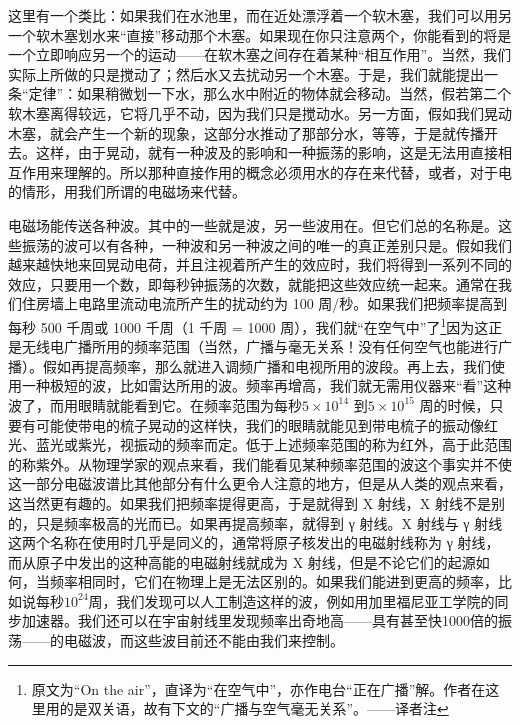 \documentclass[11pt,oneside]{book}
\begin{document}
\begin{common-format}
这里有一个类比：如果我们在水池里，而在近处漂浮着一个软木塞，我们可以用另一个软木塞划水来“直接”移动那个木塞。如果现在你只注意两个，你能看到的将是一个立即响应另一个的运动——在软木塞之间存在着某种“相互作用”。当然，我们实际上所做的只是搅动了；然后水又去扰动另一个木塞。于是，我们就能提出一条“定律”：如果稍微划一下水，那么水中附近的物体就会移动。当然，假若第二个软木塞离得较远，它将几乎不动，因为我们只是搅动水。另一方面，假如我们晃动木塞，就会产生一个新的现象，这部分水推动了那部分水，等等，于是就传播开去。这样，由于晃动，就有一种波及的影响和一种振荡的影响，这是无法用直接相互作用来理解的。所以那种直接作用的概念必须用水的存在来代替，或者，对于电的情形，用我们所谓的电磁场来代替。

电磁场能传送各种波。其中的一些就是波，另一些波用在。但它们总的名称是。这些振荡的波可以有各种，一种波和另一种波之间的唯一的真正差别只是。假如我们越来越快地来回晃动电荷，并且注视着所产生的效应时，我们将得到一系列不同的效应，只要用一个数，即每秒钟振荡的次数，就能把这些效应统一起来。通常在我们住房墙上电路里流动电流所产生的扰动约为 100 周/秒。如果我们把频率提高到每秒 500 千周或 1000 千周（1 千周 = 1000 周），我们就“在空气中”了\footnote{原文为“On the air”，直译为“在空气中”，亦作电台“正在广播”解。作者在这里用的是双关语，故有下文的“广播与空气毫无关系”。——译者注}因为这正是无线电广播所用的频率范围（当然，广播与毫无关系！没有任何空气也能进行广播）。假如再提高频率，那么就进入调频广播和电视所用的波段。再上去，我们使用一种极短的波，比如雷达所用的波。频率再增高，我们就无需用仪器来“看”这种波了，而用眼睛就能看到它。在频率范围为每秒$ 5\times10^{14} $  到$ 5\times10^{15}  $ 周的时候，只要有可能使带电的梳子晃动的这样快，我们的眼睛就能见到带电梳子的振动像红光、蓝光或紫光，视振动的频率而定。低于上述频率范围的称为红外，高于此范围的称紫外。从物理学家的观点来看，我们能看见某种频率范围的波这个事实并不使这一部分电磁波谱比其他部分有什么更令人注意的地方，但是从人类的观点来看，这当然更有趣的。如果我们把频率提得更高，于是就得到 X 射线，X 射线不是别的，只是频率极高的光而已。如果再提高频率，就得到 γ 射线。X 射线与 γ 射线这两个名称在使用时几乎是同义的，通常将原子核发出的电磁射线称为 γ 射线，而从原子中发出的这种高能的电磁射线就成为 X 射线，但是不论它们的起源如何，当频率相同时，它们在物理上是无法区别的。如果我们能进到更高的频率，比如说每秒$10^{24}$周，我们发现可以人工制造这样的波，例如用加里福尼亚工学院的同步加速器。我们还可以在宇宙射线里发现频率出奇地高——具有甚至快1000倍的振荡——的电磁波，而这些波目前还不能由我们来控制。
\begin{table}[H]

\end{table}
\end{common-format}
\end{document}
